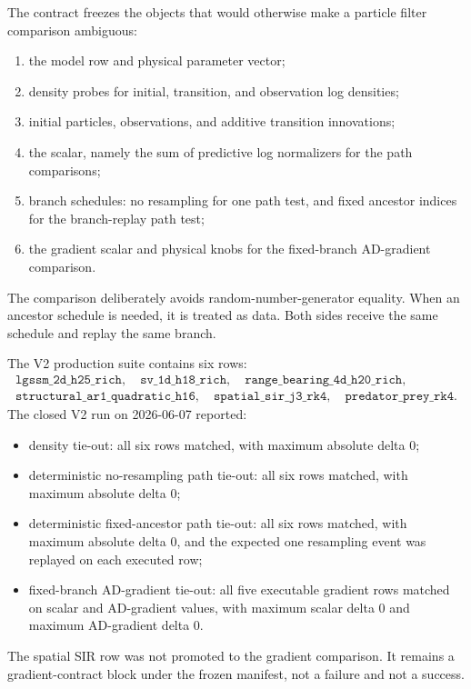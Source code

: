 The contract freezes the objects that would otherwise make a particle filter
comparison ambiguous:
\begin{enumerate}[label=(\roman*)]
  \item the model row and physical parameter vector;
  \item density probes for initial, transition, and observation log densities;
  \item initial particles, observations, and additive transition innovations;
  \item the scalar, namely the sum of predictive log normalizers for the path
    comparisons;
  \item branch schedules: no resampling for one path test, and fixed ancestor
    indices for the branch-replay path test;
  \item the gradient scalar and physical knobs for the fixed-branch AD-gradient
    comparison.
\end{enumerate}
The comparison deliberately avoids random-number-generator equality.  When an
ancestor schedule is needed, it is treated as data.  Both sides receive the same
schedule and replay the same branch.

The V2 production suite contains six rows:
\[
\begin{gathered}
\texttt{lgssm\_2d\_h25\_rich},\quad
\texttt{sv\_1d\_h18\_rich},\quad
\texttt{range\_bearing\_4d\_h20\_rich},\\
\texttt{structural\_ar1\_quadratic\_h16},\quad
\texttt{spatial\_sir\_j3\_rk4},\quad
\texttt{predator\_prey\_rk4}.
\end{gathered}
\]
The closed V2 run on 2026-06-07 reported:
\begin{itemize}
  \item density tie-out: all six rows matched, with maximum absolute delta
    \(0\);
  \item deterministic no-resampling path tie-out: all six rows matched, with
    maximum absolute delta \(0\);
  \item deterministic fixed-ancestor path tie-out: all six rows matched, with
    maximum absolute delta \(0\), and the expected one resampling event was
    replayed on each executed row;
  \item fixed-branch AD-gradient tie-out: all five executable gradient rows
    matched on scalar and AD-gradient values, with maximum scalar delta \(0\)
    and maximum AD-gradient delta \(0\).
\end{itemize}
The spatial SIR row was not promoted to the gradient comparison.  It remains a
gradient-contract block under the frozen manifest, not a failure and not a
success.

